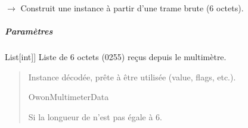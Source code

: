 \documentclass[letterpaper,10pt,french]{sphinxmanual}
\begin{document}
\begin{fulllineitems}
\begin{fulllineitems}
\label{\detokenize{api/hardware.devices:hardware.devices.owon_multimeter.OwonMultimeterData.sign}}
\pysigstartsignatures
\pysigline
{}
\pysigstopsignatures
\end{fulllineitems}


\begin{fulllineitems}
\label{\detokenize{api/hardware.devices:hardware.devices.owon_multimeter.OwonMultimeterData.from_raw}}
\pysigstartsignatures
\pysiglinewithargsret
{}
{}
{{ $\rightarrow$ {\hyperref[\detokenize{api/hardware.devices:hardware.devices.owon_multimeter.OwonMultimeterData}]{}}}}
\pysigstopsignatures
\sphinxAtStartPar
Construit une instance à partir d’une trame brute (6 octets).


\subparagraph{Paramètres}
\label{\detokenize{api/hardware.devices:id3}}\begin{description}
\sphinxlineitem{raw\_data}{[}List{[}int{]}{]}
\sphinxAtStartPar
Liste de 6 octets (0\textendash{}255) reçus depuis le multimètre.

\end{description}
\begin{quote}\begin{description}
\sphinxAtStartPar
Instance décodée, prête à être utilisée (value, flags, etc.).

\sphinxAtStartPar
OwonMultimeterData

\sphinxAtStartPar
Si la longueur de  n’est pas égale à 6.

\end{description}\end{quote}

\end{fulllineitems}


\end{fulllineitems}
\end{document}
